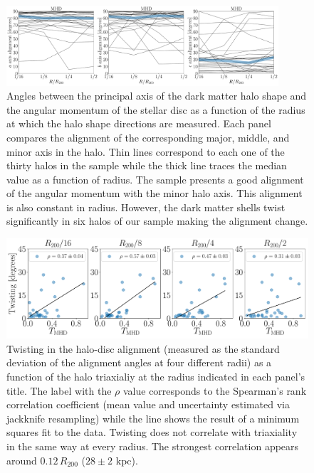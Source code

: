 \documentclass[usenatbib]{mnras}
\begin{document}
\begin{figure}
\begin{center}
\includegraphics[width=0.9\textwidth]{angles_alignment_MHD.pdf}
\end{center}
\caption{Angles between the principal axis of the dark matter halo
  shape and the angular momentum of the stellar disc 
  as a function of the radius at
  which the halo shape directions are measured.
  Each panel compares the alignment of the corresponding
  major, middle, and minor axis in the halo.
  Thin lines correspond to each one of the thirty halos in the sample
  while the thick line traces the median value as a function of  radius.
  The sample presents a good alignment of the angular
  momentum with the minor halo axis. 
  This alignment is also constant in radius.
  However, the dark matter shells twist significantly in six halos 
  of our sample making the alignment change. 
}
\label{fig:cumulative_alignment}
\end{figure}


\begin{figure}
\begin{center}
\includegraphics[width=1.0\textwidth]{correlations_twisting_triaxiality_MHD.pdf}
\end{center}
\caption{Twisting in the halo-disc alignment (measured as the standard
  deviation of the alignment angles at four different radii)
  as a function of the halo triaxialiy at the radius indicated
  in each panel's title.
  The label with the $\rho$ value corresponds to the Spearman's rank
  correlation coefficient (mean value and uncertainty estimated via
  jackknife resampling) while the line shows the result of a
  minimum squares fit to the data.
  Twisting does not correlate with triaxiality in the same way at every
  radius. The strongest correlation appears around $0.12\, R_{200}$ ($28\pm2$ kpc).} 
\label{fig:alignment_correlations}
\end{figure}
\end{document}
